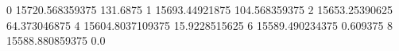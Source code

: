 0 15720.568359375 131.6875
1 15693.44921875 104.568359375
2 15653.25390625 64.373046875
4 15604.8037109375 15.9228515625
6 15589.490234375 0.609375
8 15588.880859375 0.0
